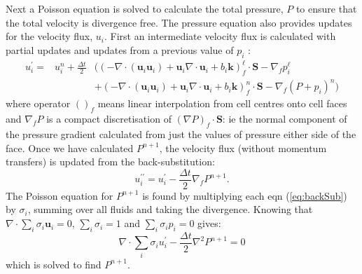 \documentclass[draft]{agujournal2019}
\begin{document}
Next a Poisson equation is solved to calculate the total pressure,
$P$ to ensure that the total velocity is divergence free.  The pressure
equation also provides updates for the velocity flux, $u_{i}$. First
an intermediate velocity flux is calculated with partial updates and
updates from a previous value of $p_{i}$ :
\begin{eqnarray}
u_{i}^{\prime}= & u_{i}^{n}+\frac{\Delta t}{2} & \biggl(\left(-\nabla\cdot(\mathbf{u}_{i}\mathbf{u}_{i})+\mathbf{u}_{i}\nabla\cdot\mathbf{u}_{i}+b_{i}\mathbf{k}\right)_{f}^{\ell}\cdot\mathbf{S}-\nabla_{f}p_{i}^{\ell}\\
 &  & +\left(-\nabla\cdot(\mathbf{u}_{i}\mathbf{u}_{i})+\mathbf{u}_{i}\nabla\cdot\mathbf{u}_{i}+b_{i}\mathbf{k}\right)_{f}^{n}\cdot\mathbf{S}-\nabla_{f}(P+p_{i})^{n}\biggr)
\end{eqnarray}
where operator $()_{f}$ means linear interpolation from cell centres
onto cell faces and $\nabla_{f}P$ is a compact discretisation of
$(\nabla P)_{f}\cdot\mathbf{S}$: ie the normal component of the pressure
gradient calculated from just the values of pressure either side of
the face. Once we have calculated $P^{n+1}$, the velocity flux (without
momentum transfers) is updated from the back-substitution:
\begin{equation}
u_{i}^{\prime\prime}=u_{i}^{\prime}-\frac{\Delta t}{2}\nabla_{f}P^{n+1}.\label{eq:backSub}
\end{equation}
The Poisson equation for $P^{n+1}$ is found by multiplying each eqn
(\ref{eq:backSub}) by $\sigma_{i}$, summing over all fluids and
taking the divergence. Knowing that $\nabla\cdot\sum_{i}\sigma_{i}\mathbf{u}_{i}=0$,
$\sum_{i}\sigma_{i}=1$ and $\sum_{i}\sigma_{i}p_{i}=0$ gives:
\begin{equation}
\nabla\cdot\sum_{i}\sigma_{i}u_{i}^{\prime}-\frac{\Delta t}{2}\nabla^{2}P^{n+1}=0
\end{equation}
which is solved to find $P^{n+1}$. 
\end{document}
